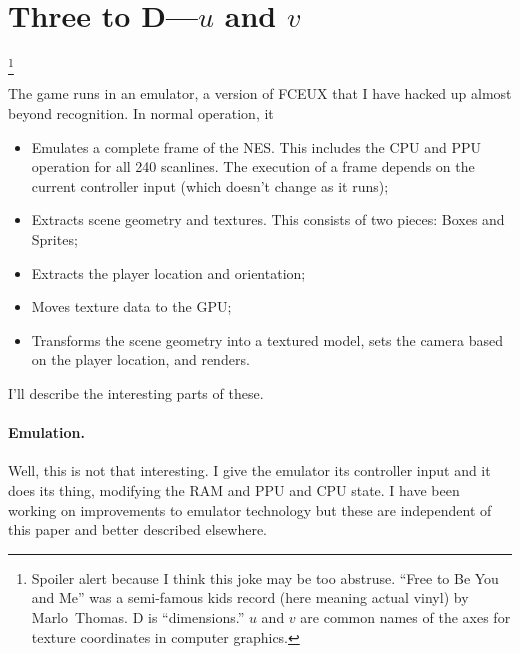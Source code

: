 \documentclass[twocolumn]{article}
\begin{document}
\section{Three to D---$u$ and $v$}\footnote{Spoiler alert because I think
this joke may be too abstruse. ``Free to Be You and Me'' was a
semi-famous kids record (here meaning actual vinyl) by 
Marlo~Thomas. D is ``dimensions.'' $u$ and $v$ are common names of
the axes for texture coordinates in computer graphics.}

The game runs in an emulator, a version of FCEUX\cite{fceux} that I
have hacked up almost beyond recognition. In normal operation, it

\begin{itemize}
\item Emulates a complete frame of the NES. This includes the CPU and
  PPU operation for all 240 scanlines. The execution of a frame depends
  on the current controller input (which doesn't change as it runs);
\item Extracts scene geometry and textures. This consists of two
  pieces: Boxes and Sprites;
\item Extracts the player location and orientation;
\item Moves texture data to the GPU;
\item Transforms the scene geometry into a textured model, sets the camera
  based on the player location, and renders.
\end{itemize}

I'll describe the interesting parts of these.

\paragraph{Emulation.} 
Well, this is not that interesting. I give the emulator its controller
input and it does its thing, modifying the RAM and PPU and CPU state.
I have been working on improvements to emulator technology but these
are independent of this paper and better described elsewhere.
\end{document}

